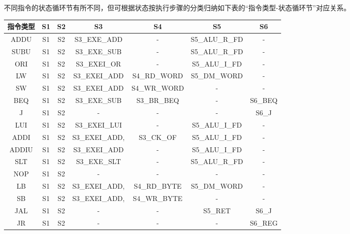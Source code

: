 \documentclass[main.tex]{subfiles}
\begin{document}
不同指令的状态循环节有所不同，但可根据状态按执行步骤的分类归纳如下表的“指令类型-状态循环节”对应关系。

\begin{center}
    \begin{tabular}{ccccccc}
        \toprule
        指令类型 & S1 & S2 & S3 & S4 & S5 & S6 \\
        \midrule
            ADDU    &   S1 & S2 & S3\_EXE\_ADD     &-              &S5\_ALU\_R\_FD   & - \\
            SUBU    &   S1 & S2 & S3\_EXE\_SUB     &-              &S5\_ALU\_R\_FD   & - \\
            ORI     &   S1 & S2 & S3\_EXEI\_OR     &-              &S5\_ALU\_I\_FD   & - \\
            LW      &   S1 & S2 & S3\_EXEI\_ADD    &S4\_RD\_WORD    &S5\_DM\_WORD    & - \\
            SW      &   S1 & S2 & S3\_EXEI\_ADD    &S4\_WR\_WORD    & -             & - \\
            BEQ     &   S1 & S2 & S3\_EXE\_SUB     &S3\_BR\_BEQ     & -             &S6\_BEQ  \\
            J       &   S1 & S2 & -               & -             & -             &S6\_J  \\
            LUI     &   S1 & S2 & S3\_EXEI\_LUI    &-              &S5\_ALU\_I\_FD   & - \\
            ADDI    &   S1 & S2 & S3\_EXEI\_ADD,   &S3\_CK\_OF      &S5\_ALU\_I\_FD   & - \\
            ADDIU   &   S1 & S2 & S3\_EXEI\_ADD    &-              &S5\_ALU\_I\_FD   & - \\
            SLT     &   S1 & S2 & S3\_EXE\_SLT     &-              &S5\_ALU\_R\_FD   & - \\
            NOP     &   S1 & S2 &-                & -             & -             & -  \\
            LB      &   S1 & S2 & S3\_EXEI\_ADD,   &S4\_RD\_BYTE    & S5\_DM\_WORD   &-  \\
            SB      &   S1 & S2 & S3\_EXEI\_ADD,   &S4\_WR\_BYTE    & -             & -  \\
            JAL     &   S1 & S2 &-                & -             &S5\_RET        &S6\_J  \\
            JR      &   S1 & S2 &-                & -             & -             &S6\_REG  \\
        \bottomrule
    \end{tabular}
\end{center}
\end{document}
